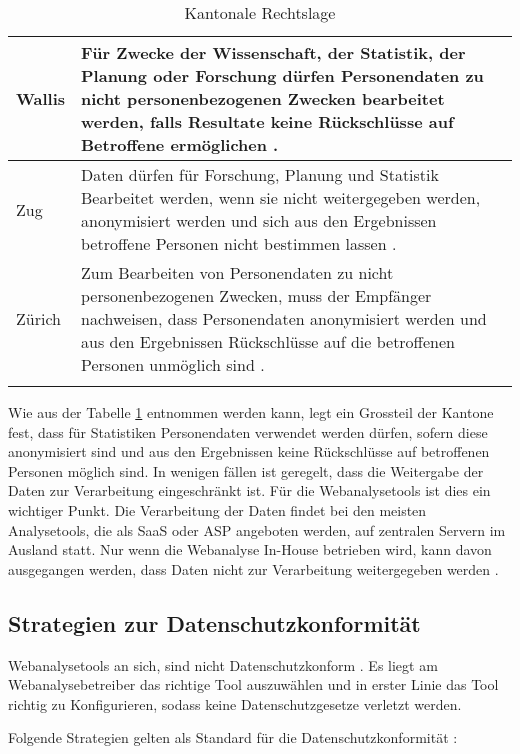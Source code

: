 \begin{longtable}{| p{} | p{}|}
		\hline
    Wallis & Für Zwecke der Wissenschaft, der Statistik, der Planung oder Forschung dürfen Personendaten zu nicht personenbezogenen Zwecken bearbeitet werden, falls Resultate keine Rückschlüsse auf Betroffene ermöglichen \parencite[§§ 26 Abs. 1]{DSSGVS}.  \\
		\hline
    Zug & Daten dürfen für Forschung, Planung und Statistik Bearbeitet werden, wenn sie nicht weitergegeben werden, anonymisiert werden und sich aus den Ergebnissen betroffene Personen nicht bestimmen lassen \parencite[§§ 4 Abs 1e]{DSSGZG}. \\
		\hline
    Zürich & Zum Bearbeiten von Personendaten zu nicht personenbezogenen Zwecken, muss der Empfänger nachweisen, dass Personendaten anonymisiert werden und aus den Ergebnissen Rückschlüsse auf die betroffenen Personen unmöglich sind \parencite[§§ 18 Abs. 1-2]{DSSGZH}. \\
		\hline

    \caption{Kantonale Rechtslage}
    \label{tab: ktrechtslage}
	\end{longtable}

  Wie aus der Tabelle \ref{tab: ktrechtslage} entnommen werden kann,
  legt ein Grossteil der Kantone fest, dass für Statistiken Personendaten verwendet werden dürfen, sofern diese anonymisiert sind und aus den Ergebnissen keine Rückschlüsse auf betroffenen Personen möglich sind. In wenigen fällen ist geregelt, dass die Weitergabe der Daten zur Verarbeitung eingeschränkt ist. Für die Webanalysetools ist dies ein wichtiger Punkt. Die Verarbeitung der Daten findet bei den meisten Analysetools, die als SaaS oder ASP angeboten werden, auf zentralen Servern im Ausland statt. Nur wenn die Webanalyse In-House betrieben wird, kann davon ausgegangen werden, dass Daten nicht zur Verarbeitung weitergegeben werden \parencite[S 174-176]{nakatani2011toolselectionmethod}.


\subsection{Strategien zur Datenschutzkonformität}
Webanalysetools an sich, sind nicht Datenschutzkonform \parencite[S. 1-4]{EcommerceUndDatenschutz}. Es liegt am Webanalysebetreiber das richtige Tool auszuwählen und in erster Linie das Tool richtig zu Konfigurieren, sodass keine Datenschutzgesetze verletzt werden.

Folgende Strategien gelten als Standard für die Datenschutzkonformität \parencite[S. 2-5]{EcommerceUndDatenschutz}:

